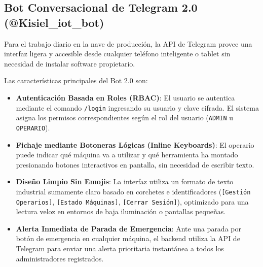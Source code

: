\documentclass[11pt,a4paper]{article}
\begin{document}
\subsection{Bot Conversacional de Telegram 2.0 (@Kisiel\_iot\_bot)}

Para el trabajo diario en la nave de producción, la API de Telegram provee una interfaz ligera y accesible desde cualquier teléfono inteligente o tablet sin necesidad de instalar software propietario.

Las características principales del Bot 2.0 son:
\begin{itemize}
    \item \textbf{Autenticación Basada en Roles (RBAC)}: El usuario se autentica mediante el comando \texttt{/login} ingresando su usuario y clave cifrada. El sistema asigna los permisos correspondientes según el rol del usuario (\texttt{ADMIN} u \texttt{OPERARIO}).
    \item \textbf{Fichaje mediante Botoneras Lógicas (Inline Keyboards)}: El operario puede indicar qué máquina va a utilizar y qué herramienta ha montado presionando botones interactivos en pantalla, sin necesidad de escribir texto.
    \item \textbf{Diseño Limpio Sin Emojis}: La interfaz utiliza un formato de texto industrial sumamente claro basado en corchetes e identificadores (\texttt{[Gestión Operarios]}, \texttt{[Estado Máquinas]}, \texttt{[Cerrar Sesión]}), optimizado para una lectura veloz en entornos de baja iluminación o pantallas pequeñas.
    \item \textbf{Alerta Inmediata de Parada de Emergencia}: Ante una parada por botón de emergencia en cualquier máquina, el backend utiliza la API de Telegram para enviar una alerta prioritaria instantánea a todos los administradores registrados.
\end{itemize}
\end{document}
